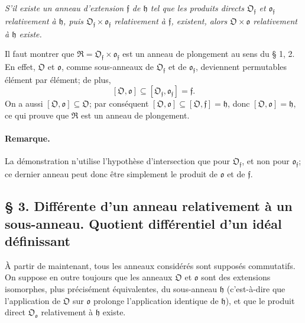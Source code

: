 \emph{S'il existe un anneau d'extension \(\mathfrak f\) de \(\mathfrak h\) tel que les produits directs \(\mathfrak O_{\mathfrak f}\) et \(\mathfrak o_{\mathfrak f}\) relativement à \(\mathfrak h\), puis \(\mathfrak O_{\mathfrak f}\times\mathfrak o_{\mathfrak f}\) relativement à \(\mathfrak f\), existent, alors \(\mathfrak O\times\mathfrak o\) relativement à \(\mathfrak h\) existe.}

Il faut montrer que \(\mathfrak R=\mathfrak O_{\mathfrak f}\times\mathfrak o_{\mathfrak f}\) est un anneau de plongement au sens du \S{} 1, 2. En effet, \(\mathfrak O\) et \(\mathfrak o\), comme sous-anneaux de \(\mathfrak O_{\mathfrak f}\) et de \(\mathfrak o_{\mathfrak f}\), deviennent permutables élément par élément; de plus,
\[
[\mathfrak O,\mathfrak o]\subseteq[\mathfrak O_{\mathfrak f},\mathfrak o_{\mathfrak f}]=\mathfrak f.
\]
On a aussi \([\mathfrak O,\mathfrak o]\subseteq\mathfrak O\); par conséquent \([\mathfrak O,\mathfrak o]\subseteq[\mathfrak O,\mathfrak f]=\mathfrak h\), donc \([\mathfrak O,\mathfrak o]=\mathfrak h\), ce qui prouve que \(\mathfrak R\) est un anneau de plongement.

\paragraph{Remarque.}
La démonstration n'utilise l'hypothèse d'intersection que pour \(\mathfrak O_{\mathfrak f}\), et non pour \(\mathfrak o_{\mathfrak f}\); ce dernier anneau peut donc être simplement le produit de \(\mathfrak o\) et de \(\mathfrak f\).

\subsection*{\S{} 3. Différente d'un anneau relativement à un sous-anneau. Quotient différentiel d'un idéal définissant}

À partir de maintenant, tous les anneaux considérés sont supposés commutatifs. On suppose en outre toujours que les anneaux \(\mathfrak O\) et \(\mathfrak o\) sont des extensions isomorphes, plus précisément équivalentes, du sous-anneau \(\mathfrak h\) (c'est-à-dire que l'application de \(\mathfrak O\) sur \(\mathfrak o\) prolonge l'application identique de \(\mathfrak h\)), et que le produit direct \(\mathfrak O_{\mathfrak o}\) relativement à \(\mathfrak h\) existe.

